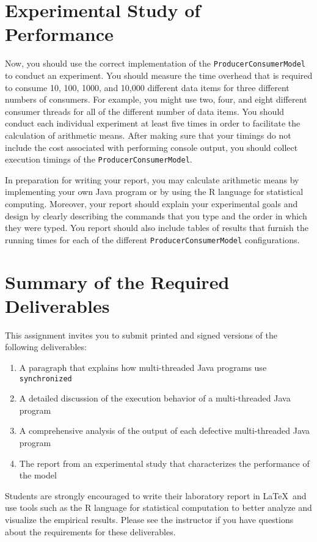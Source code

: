 \section*{Experimental Study of Performance}

Now, you should use the correct implementation of the {\tt ProducerConsumerModel} to conduct an experiment.  You should
measure the time overhead that is required to consume 10, 100, 1000, and 10,000 different data items for three different
numbers of consumers.  For example, you might use two, four, and eight different consumer threads for all of the
different number of data items.  You should conduct each individual experiment at least five times in order to
facilitate the calculation of arithmetic means.  After making sure that your timings do not include the cost associated
with performing console output, you should collect execution timings of the {\tt ProducerConsumerModel}.  

In preparation for writing your report, you may calculate arithmetic means by implementing your own Java program or by
using the R language for statistical computing.  Moreover, your report should explain your experimental goals and design
by clearly describing the commands that you type and the order in which they were typed.  You report should also include
tables of results that furnish the running times for each of the different {\tt ProducerConsumerModel} configurations.  

\section*{Summary of the Required Deliverables}

This assignment invites you to submit printed and signed versions of the following deliverables: 

\begin{enumerate} \item A paragraph that explains how multi-threaded Java programs use {\tt synchronized} \item A
    detailed discussion of the execution behavior of a multi-threaded Java program \item A comprehensive analysis of the
    output of each defective multi-threaded Java program \item The report from an experimental study that characterizes
    the performance of the model \end{enumerate}

Students are strongly encouraged to write their laboratory report in \LaTeX~and use tools such as the R language for
statistical computation to better analyze and visualize the empirical results. Please see the instructor if you have
questions about the requirements for these deliverables.

